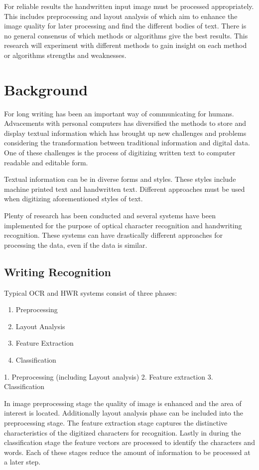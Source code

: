 \documentclass{article}
\begin{document}
  For reliable results the handwritten input image must be processed appropriately. This includes preprocessing and layout analysis of which aim to enhance the image quality for later processing and find the different bodies of text. There is no general consensus of which methods or algorithms give the best results. This research will experiment with different methods to gain insight on each method or algorithms strengths and weaknesses.

\newpage
\section{Background}
  For long writing has been an important way of communicating for humans.  Advacements with personal computers has diversified the methods to store and display textual information which has brought up new challenges and problems considering the transformation between traditional information and digital data. One of these challenges is the process of digitizing written text to computer readable and editable form.

  Textual information can be in diverse forms and styles. These styles include machine printed text and handwritten text. Different approaches must be used when digitizing aforementioned styles of text.

  Plenty of research has been conducted and several systems have been implemented for the purpose of optical character recognition and handwriting recognition. These systems can have drastically different approaches for processing the data, even if the data is similar.

\subsection{Writing Recognition}
Typical OCR and HWR systems consist of three phases:
\begin{enumerate}
  \item{Preprocessing}
  \item{Layout Analysis}
  \item{Feature Extraction}
  \item{Classification}
\end{enumerate}
1. Preprocessing
(including Layout analysis)
2. Feature extraction
3. Classification

In image preprocessing stage the quality of image is enhanced and the area of interest is located. Additionally layout analysis phase can be included into the preprocessing stage. The feature extraction stage captures the distinctive characteristics of the digitized characters for recognition. Lastly in during the classification stage the feature vectors are processed to identify the characters and words. Each of these stages reduce the amount of information to be processed at a later step. \cite{Cheriet2007}
\end{document}
